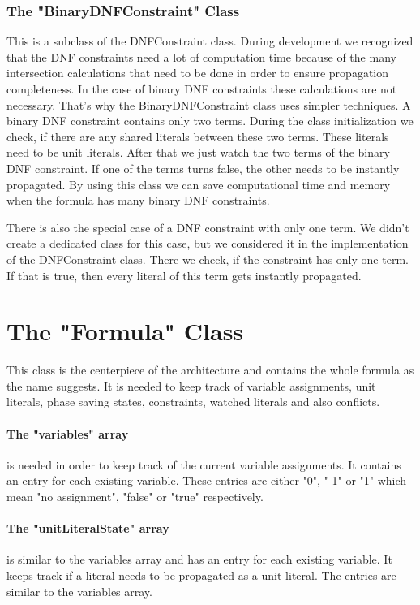 \subsubsection{The "BinaryDNFConstraint" Class}

This is a subclass of the DNFConstraint class. During development we recognized that the DNF constraints need a lot of computation time because of the many intersection calculations that need to be done in order to ensure propagation completeness. In the case of binary DNF constraints these calculations are not necessary. That's why the BinaryDNFConstraint class uses simpler techniques. A binary DNF constraint contains only two terms. During the class initialization we check, if there are any shared literals between these two terms. These literals need to be unit literals. After that we just watch the two terms of the binary DNF constraint. If one of the terms turns false, the other needs to be instantly propagated. By using this class we can save computational time and memory when the formula has many binary DNF constraints.

There is also the special case of a DNF constraint with only one term. We didn't create a dedicated class for this case, but we considered it in the implementation of the DNFConstraint class. There we check, if the constraint has only one term. If that is true, then every literal of this term gets instantly propagated.

\section{The "Formula" Class}

This class is the centerpiece of the architecture and contains the whole formula as the name suggests. It is needed to keep track of variable assignments, unit literals, phase saving states, constraints, watched literals and also conflicts.
\paragraph{The "variables" array} is needed in order to keep track of the current variable assignments. It contains an entry for each existing variable. These entries are either "0", "-1" or "1" which mean "no assignment", "false" or "true" respectively.
\paragraph{The "unitLiteralState" array} is similar to the variables array and has an entry for each existing variable. It keeps track if a literal needs to be propagated as a unit literal. The entries are similar to the variables array.
